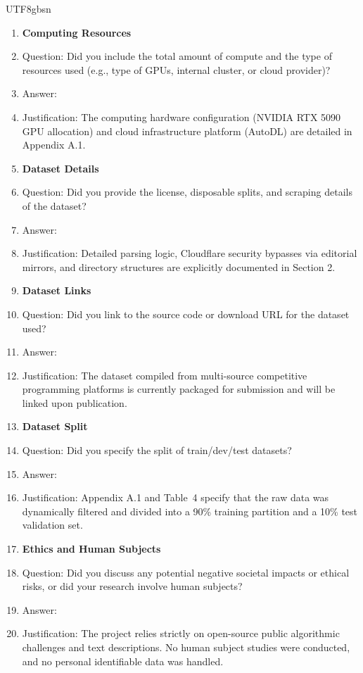 \documentclass{article}
\begin{document}
\begin{CJK*}{UTF8}{gbsn}
\begin{enumerate}
\item {\bf Computing Resources}
    \item[] Question: Did you include the total amount of compute and the type of resources used (e.g., type of GPUs, internal cluster, or cloud provider)?
    \item[] Answer: \answerYes{}
    \item[] Justification: The computing hardware configuration (NVIDIA RTX 5090 GPU allocation) and cloud infrastructure platform (AutoDL) are detailed in Appendix A.1.

\item {\bf Dataset Details}
    \item[] Question: Did you provide the license, disposable splits, and scraping details of the dataset?
    \item[] Answer: \answerYes{}
    \item[] Justification: Detailed parsing logic, Cloudflare security bypasses via editorial mirrors, and directory structures are explicitly documented in Section 2.

\item {\bf Dataset Links}
    \item[] Question: Did you link to the source code or download URL for the dataset used?
    \item[] Answer: \answerNo{}
    \item[] Justification: The dataset compiled from multi-source competitive programming platforms is currently packaged for submission and will be linked upon publication.

\item {\bf Dataset Split}
    \item[] Question: Did you specify the split of train/dev/test datasets?
    \item[] Answer: \answerYes{}
    \item[] Justification: Appendix A.1 and Table~4 specify that the raw data was dynamically filtered and divided into a 90\% training partition and a 10\% test validation set.

\item {\bf Ethics and Human Subjects}
    \item[] Question: Did you discuss any potential negative societal impacts or ethical risks, or did your research involve human subjects?
    \item[] Answer: \answerNA{}
    \item[] Justification: The project relies strictly on open-source public algorithmic challenges and text descriptions. No human subject studies were conducted, and no personal identifiable data was handled.


\end{enumerate}
\end{CJK*}
\end{document}
